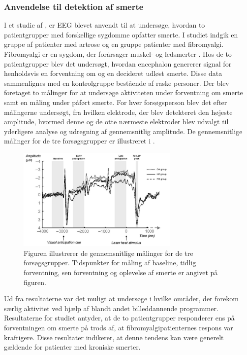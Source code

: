 \subsubsection{Anvendelse til detektion af smerte}
I et studie af , er EEG blevet anvendt til at undersøge, hvordan to patientgrupper med forskellige sygdomme opfatter smerte. I studiet indgik en gruppe af patienter med artrose og en gruppe patienter med fibromyalgi. Fibromyalgi er en sygdom, der forårsager muskel- og ledsmerter \citep{Gigtforeningen2016}. Hos de to patientgrupper blev det undersøgt, hvordan encephalon genererer signal for henholdsvis en forventning om og en decideret udløst smerte. Disse data sammenlignes med en kontrolgruppe bestående af raske personer. Der blev foretaget to målinger for at undersøge aktiviteten under forventning om smerte samt en måling under påført smerte. For hver forsøgsperson blev det efter målingerne undersøgt, fra hvilken elektrode, der blev detekteret den højeste amplitude, hvormed denne og de otte nærmeste elektroder blev udvalgt til yderligere analyse og udregning af gennemsnitlig amplitude. De gennemsnitlige målinger for de tre forsøgsgrupper er illustreret i .
\begin{figure}[H] 
	\begin{center}
		\includegraphics[width=0.7\textwidth]{figures/bProblemanalyse/EEG_ERP}
	\end{center}
	\caption{Figuren illustrerer de gennemsnitlige målinger for de tre forsøgsgrupper. Tidspunkter for måling af baseline, tidlig forventning, sen forventning og oplevelse af smerte er angivet på figuren. \citep{Brown2013}} 
	\label{fig:EEG_gns} 
\end{figure} 

Ud fra resultaterne var det muligt at undersøge i hvilke områder, der forekom særlig aktivitet ved hjælp af blandt andet billeddannende programmer. Resultaterne for studiet antyder, at de to patientgrupper responderer ens på forventningen om smerte på trods af, at fibromyalgipatienternes respons var kraftigere. Disse resultater indikerer, at denne tendens kan være generelt gældende for patienter med kroniske smerter. \citep{Brown2013} 

